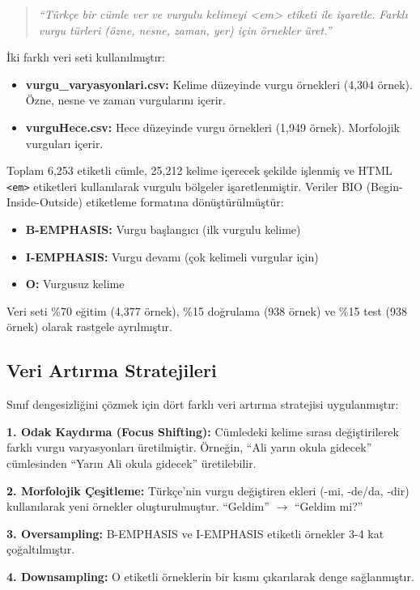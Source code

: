 \documentclass[conference]{IEEEtran}
\begin{document}
\begin{quote}
\textit{``Türkçe bir cümle ver ve vurgulu kelimeyi <em> etiketi ile işaretle. Farklı vurgu türleri (özne, nesne, zaman, yer) için örnekler üret.''}
\end{quote}

İki farklı veri seti kullanılmıştır:
\begin{itemize}
    \item \textbf{vurgu\_varyasyonlari.csv:} Kelime düzeyinde vurgu örnekleri (4,304 örnek). Özne, nesne ve zaman vurgularını içerir.
    \item \textbf{vurguHece.csv:} Hece düzeyinde vurgu örnekleri (1,949 örnek). Morfolojik vurguları içerir.
\end{itemize}

Toplam 6,253 etiketli cümle, 25,212 kelime içerecek şekilde işlenmiş ve HTML \texttt{<em>} etiketleri kullanılarak vurgulu bölgeler işaretlenmiştir. Veriler BIO (Begin-Inside-Outside) etiketleme formatına dönüştürülmüştür:
\begin{itemize}
    \item \textbf{B-EMPHASIS:} Vurgu başlangıcı (ilk vurgulu kelime)
    \item \textbf{I-EMPHASIS:} Vurgu devamı (çok kelimeli vurgular için)
    \item \textbf{O:} Vurgusuz kelime
\end{itemize}

Veri seti \%70 eğitim (4,377 örnek), \%15 doğrulama (938 örnek) ve \%15 test (938 örnek) olarak rastgele ayrılmıştır.

\subsection{Veri Artırma Stratejileri}
Sınıf dengesizliğini çözmek için dört farklı veri artırma stratejisi uygulanmıştır:

\textbf{1. Odak Kaydırma (Focus Shifting):} Cümledeki kelime sırası değiştirilerek farklı vurgu varyasyonları üretilmiştir. Örneğin, ``Ali yarın okula gidecek'' cümlesinden ``Yarın Ali okula gidecek'' üretilebilir.

\textbf{2. Morfolojik Çeşitleme:} Türkçe'nin vurgu değiştiren ekleri (-mi, -de/da, -dir) kullanılarak yeni örnekler oluşturulmuştur. ``Geldim'' $\rightarrow$ ``Geldim mi?''

\textbf{3. Oversampling:} B-EMPHASIS ve I-EMPHASIS etiketli örnekler 3-4 kat çoğaltılmıştır.

\textbf{4. Downsampling:} O etiketli örneklerin bir kısmı çıkarılarak denge sağlanmıştır.
\end{document}
